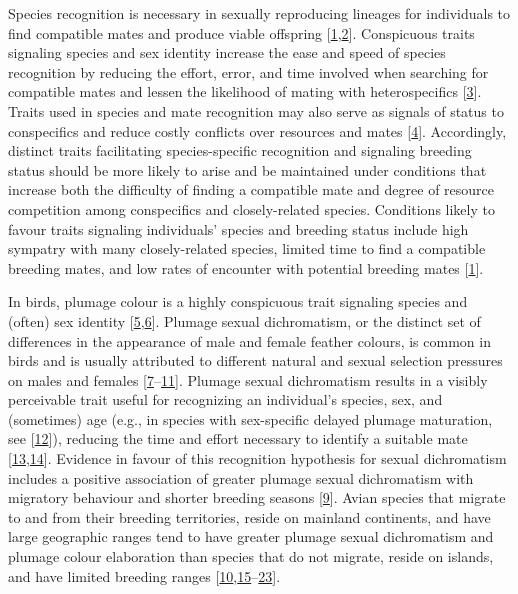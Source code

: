 \documentclass[
  a4paper,
]{article}
\begin{document}
Species recognition is necessary in sexually reproducing lineages for
individuals to find compatible mates and produce viable offspring
{[}\protect\hyperlink{ref-andersson1994}{1},\protect\hyperlink{ref-groning2008}{2}{]}.
Conspicuous traits signaling species and sex identity increase the ease
and speed of species recognition by reducing the effort, error, and time
involved when searching for compatible mates and lessen the likelihood
of mating with heterospecifics
{[}\protect\hyperlink{ref-pfennig2012}{3}{]}. Traits used in species and
mate recognition may also serve as signals of status to conspecifics and
reduce costly conflicts over resources and mates
{[}\protect\hyperlink{ref-west-eberhard1983}{4}{]}. Accordingly,
distinct traits facilitating species-specific recognition and signaling
breeding status should be more likely to arise and be maintained under
conditions that increase both the difficulty of finding a compatible
mate and degree of resource competition among conspecifics and
closely-related species. Conditions likely to favour traits signaling
individuals' species and breeding status include high sympatry with many
closely-related species, limited time to find a compatible breeding
mates, and low rates of encounter with potential breeding mates
{[}\protect\hyperlink{ref-andersson1994}{1}{]}.

In birds, plumage colour is a highly conspicuous trait signaling species
and (often) sex identity
{[}\protect\hyperlink{ref-martin2015a}{5},\protect\hyperlink{ref-bitton2016}{6}{]}.
Plumage sexual dichromatism, or the distinct set of differences in the
appearance of male and female feather colours, is common in birds and is
usually attributed to different natural and sexual selection pressures
on males and females
{[}\protect\hyperlink{ref-martin1996}{7}--\protect\hyperlink{ref-dunn2015}{11}{]}.
Plumage sexual dichromatism results in a visibly perceivable trait
useful for recognizing an individual's species, sex, and (sometimes) age
(e.g., in species with sex-specific delayed plumage maturation, see
{[}\protect\hyperlink{ref-hawkins2012}{12}{]}), reducing the time and
effort necessary to identify a suitable mate
{[}\protect\hyperlink{ref-hamilton1961}{13},\protect\hyperlink{ref-saetre1992}{14}{]}.
Evidence in favour of this recognition hypothesis for sexual
dichromatism includes a positive association of greater plumage sexual
dichromatism with migratory behaviour and shorter breeding seasons
{[}\protect\hyperlink{ref-badyaev2003}{9}{]}. Avian species that migrate
to and from their breeding territories, reside on mainland continents,
and have large geographic ranges tend to have greater plumage sexual
dichromatism and plumage colour elaboration than species that do not
migrate, reside on islands, and have limited breeding ranges
{[}\protect\hyperlink{ref-dale2015}{10},\protect\hyperlink{ref-friedman2009}{15}--\protect\hyperlink{ref-kearns2020}{23}{]}.
\end{document}

